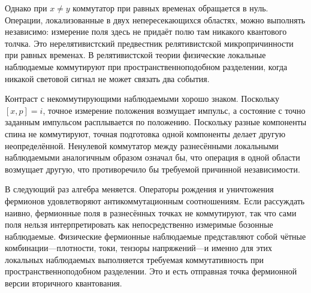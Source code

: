 \begin{classroomqa}
\end{classroomqa}

Однако при \(x\neq y\) коммутатор при равных временах обращается в нуль. Операции, локализованные в двух непересекающихся областях, можно выполнять независимо: измерение поля здесь не придаёт полю там никакого квантового толчка. Это нерелятивистский предвестник релятивистской микропричинности при равных временах. В релятивистской теории физические локальные наблюдаемые коммутируют при пространственноподобном разделении, когда никакой световой сигнал не может связать два события.

Контраст с некоммутирующими наблюдаемыми хорошо знаком. Поскольку \([x,p]=i\), точное измерение положения возмущает импульс, а состояние с точно заданным импульсом расплывается по положению. Поскольку разные компоненты спина не коммутируют, точная подготовка одной компоненты делает другую неопределённой. Ненулевой коммутатор между разнесёнными локальными наблюдаемыми аналогичным образом означал бы, что операция в одной области возмущает другую, что противоречило бы требуемой причинной независимости.

\begin{classroomqa}
\end{classroomqa}

В следующий раз алгебра меняется. Операторы рождения и уничтожения фермионов удовлетворяют антикоммутационным соотношениям. Если рассуждать наивно, фермионные поля в разнесённых точках не коммутируют, так что сами поля нельзя интерпретировать как непосредственно измеримые бозонные наблюдаемые. Физические фермионные наблюдаемые представляют собой чётные комбинации---плотности, токи, тензоры напряжений---и именно для этих локальных наблюдаемых выполняется требуемая коммутативность при пространственноподобном разделении. Это и есть отправная точка фермионной версии вторичного квантования.
